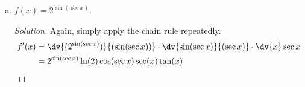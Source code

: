 \begin{enumerate}[(a)]
\begin{proof}[Solution]
\begin{align*}
             & = \frac{2\tan x \sec^2x}{\sqrt{2\tan^2x+3}} \qedhere
          \end{align*}
        \end{proof}
  \item $f(x)=2^{\sin(\sec x)}$.
        \begin{proof}[Solution]
          Again, simply apply the chain rule repeatedly.
          \begin{align*}
            f'(x)
             & = \dv{(2^{\sin(\sec x)})}{(\sin(\sec x))}\cdot\dv{\sin(\sec x)}{(\sec x)}\cdot\dv{x}\sec x \\
             & = 2^{\sin(\sec x)}\ln(2)\cos(\sec x)\sec(x)\tan(x) \qedhere
          \end{align*}
        \end{proof}
\end{enumerate}


